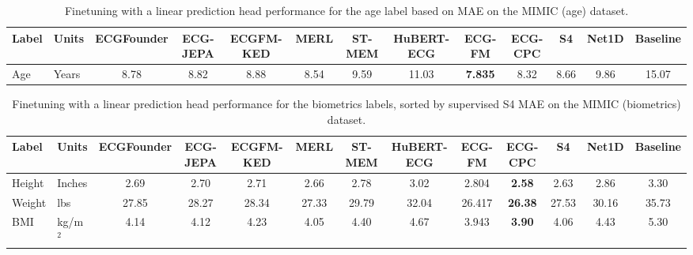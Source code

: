 \documentclass{article}
\begin{document}
                \begin{table}[htbp]
                    \centering
                    \tiny
                    \setlength{\tabcolsep}{2pt}
                    \caption{Finetuning with a linear prediction head performance for the age label based on MAE on the MIMIC (age) dataset.}
                    \begin{tabular}{llccccccccccc}
                        \toprule
                        \textbf{Label} & \textbf{Units} & \textbf{ECGFounder} & \textbf{ECG-JEPA} & \textbf{ECGFM-KED} & \textbf{MERL} & \textbf{ST-MEM} & \textbf{HuBERT-ECG} & \textbf{ECG-FM} & \textbf{ECG-CPC} & \textbf{S4} & \textbf{Net1D} & \textbf{Baseline} \\
                        \midrule
                        Age & Years & 8.78 & 8.82 & 8.88 & 8.54 & 9.59 & 11.03 & \textbf{7.835} & 8.32 & 8.66 & 9.86 & 15.07 \\
                        \bottomrule
                    \end{tabular}
                    \label{tab:results_overview_age}
                \end{table}

                \begin{table}[htbp]
                    \centering
                    \tiny
                    \setlength{\tabcolsep}{2pt}
                    \caption{Finetuning with a linear prediction head performance for the biometrics labels, sorted by supervised S4 MAE on the MIMIC (biometrics) dataset.}
                    \begin{tabular}{llccccccccccc}
                        \toprule
                        \textbf{Label} & \textbf{Units} & \textbf{ECGFounder} & \textbf{ECG-JEPA} & \textbf{ECGFM-KED} & \textbf{MERL} & \textbf{ST-MEM} & \textbf{HuBERT-ECG} & \textbf{ECG-FM} & \textbf{ECG-CPC} & \textbf{S4} & \textbf{Net1D} & \textbf{Baseline} \\
                        \midrule
                        Height & Inches & 2.69 & 2.70 & 2.71 & 2.66 & 2.78 & 3.02 & 2.804 & \textbf{2.58} & 2.63 & 2.86 & 3.30 \\
                        Weight & lbs & 27.85 & 28.27 & 28.34 & 27.33 & 29.79 & 32.04 & 26.417 & \textbf{26.38} & 27.53 & 30.16 & 35.73 \\
                        BMI & kg/m$^2$ & 4.14 & 4.12 & 4.23 & 4.05 & 4.40 & 4.67 & 3.943 & \textbf{3.90} & 4.06 & 4.43 & 5.30 \\
                        \bottomrule
                    \end{tabular}
                    \label{tab:results_overview_biometrics}
                \end{table}
\end{document}
